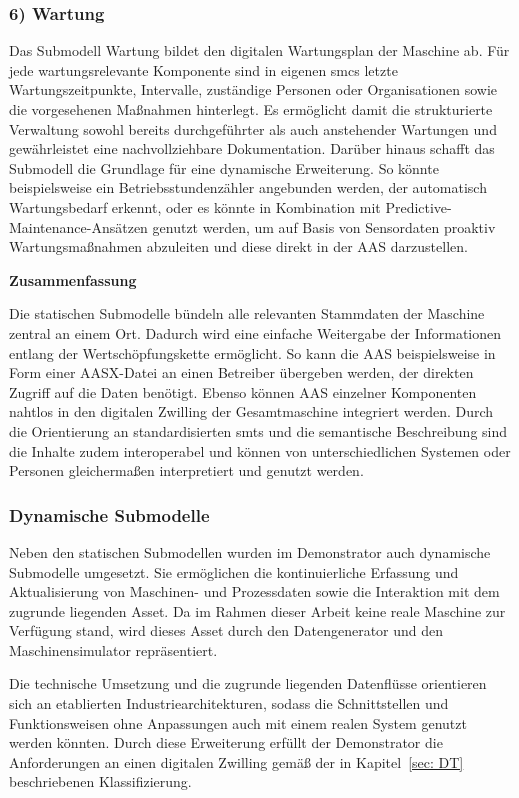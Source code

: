 \subsubsection*{6) Wartung}
Das Submodell Wartung bildet den digitalen Wartungsplan der Maschine ab. 
Für jede wartungsrelevante Komponente sind in eigenen \acsp{smc} letzte Wartungszeitpunkte, Intervalle, zuständige Personen oder Organisationen sowie die vorgesehenen Maßnahmen hinterlegt. 
Es ermöglicht damit die strukturierte Verwaltung sowohl bereits durchgeführter als auch anstehender Wartungen und gewährleistet eine nachvollziehbare Dokumentation. 
Darüber hinaus schafft das Submodell die Grundlage für eine dynamische Erweiterung. 
So könnte beispielsweise ein Betriebsstundenzähler angebunden werden, der automatisch Wartungsbedarf erkennt, oder es könnte in Kombination mit Predictive-Maintenance-Ansätzen genutzt werden, um auf Basis von Sensordaten proaktiv Wartungsmaßnahmen abzuleiten und diese direkt in der AAS darzustellen. 

\textbf{Zusammenfassung}  

Die statischen Submodelle bündeln alle relevanten Stammdaten der Maschine zentral an einem Ort. 
Dadurch wird eine einfache Weitergabe der Informationen entlang der Wertschöpfungskette ermöglicht. 
So kann die AAS beispielsweise in Form einer AASX-Datei an einen Betreiber übergeben werden, der direkten Zugriff auf die Daten benötigt. 
Ebenso können AAS einzelner Komponenten nahtlos in den digitalen Zwilling der Gesamtmaschine integriert werden. 
Durch die Orientierung an standardisierten \acsp{smt} und die semantische Beschreibung sind die Inhalte zudem interoperabel und können von unterschiedlichen Systemen oder Personen gleichermaßen interpretiert und genutzt werden. 

\subsubsection{Dynamische Submodelle}
\label{sec:DynamischeSubmodelle}
Neben den statischen Submodellen wurden im Demonstrator auch dynamische Submodelle umgesetzt.
Sie ermöglichen die kontinuierliche Erfassung und Aktualisierung von Maschinen- und Prozessdaten sowie die Interaktion mit dem zugrunde liegenden Asset.
Da im Rahmen dieser Arbeit keine reale Maschine zur Verfügung stand, wird dieses Asset durch den Datengenerator und den Maschinensimulator repräsentiert.

Die technische Umsetzung und die zugrunde liegenden Datenflüsse orientieren sich an etablierten Industriearchitekturen, sodass die Schnittstellen und Funktionsweisen ohne Anpassungen auch mit einem realen System genutzt werden könnten.
Durch diese Erweiterung erfüllt der Demonstrator die Anforderungen an einen digitalen Zwilling gemäß der in Kapitel~\ref{sec: DT} beschriebenen Klassifizierung.

